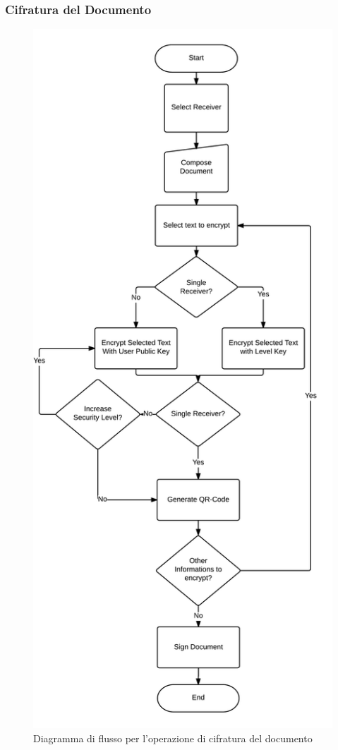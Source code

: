 \subsubsection{Cifratura del Documento}

	\begin{center}	
		\begin{figure}[H]
		\centering
		\includegraphics[scale=0.6]{Immagini/cifratura_vert}
		\caption[Flusso cifratura documento]{Diagramma di flusso per l'operazione di cifratura del documento}
		\label{fig:cifratura}
		\end{figure}
	\end{center}
